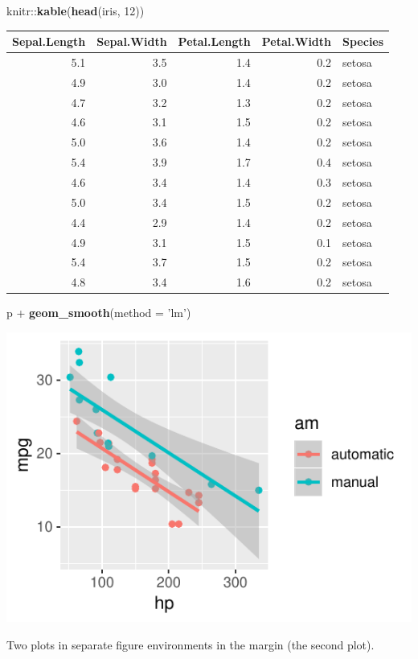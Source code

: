 \documentclass[]{tufte-handout}
\newenvironment{Shaded}{}{}
\newcommand{\DataTypeTok}[1]{\textcolor[rgb]{0.56,0.13,0.00}{#1}}
\newcommand{\DecValTok}[1]{\textcolor[rgb]{0.25,0.63,0.44}{#1}}
\newcommand{\KeywordTok}[1]{\textcolor[rgb]{0.00,0.44,0.13}{\textbf{#1}}}
\newcommand{\NormalTok}[1]{#1}
\newcommand{\OperatorTok}[1]{\textcolor[rgb]{0.40,0.40,0.40}{#1}}
\newcommand{\StringTok}[1]{\textcolor[rgb]{0.25,0.44,0.63}{#1}}
\begin{document}
\begin{Shaded}
\begin{Highlighting}[]
\NormalTok{knitr}\OperatorTok{::}\KeywordTok{kable}\NormalTok{(}\KeywordTok{head}\NormalTok{(iris, }\DecValTok{12}\NormalTok{))}
\end{Highlighting}
\end{Shaded}

\begin{longtable}[]{@{}rrrrl@{}}
\toprule
Sepal.Length & Sepal.Width & Petal.Length & Petal.Width &
Species\tabularnewline
\midrule
\endhead
5.1 & 3.5 & 1.4 & 0.2 & setosa\tabularnewline
4.9 & 3.0 & 1.4 & 0.2 & setosa\tabularnewline
4.7 & 3.2 & 1.3 & 0.2 & setosa\tabularnewline
4.6 & 3.1 & 1.5 & 0.2 & setosa\tabularnewline
5.0 & 3.6 & 1.4 & 0.2 & setosa\tabularnewline
5.4 & 3.9 & 1.7 & 0.4 & setosa\tabularnewline
4.6 & 3.4 & 1.4 & 0.3 & setosa\tabularnewline
5.0 & 3.4 & 1.5 & 0.2 & setosa\tabularnewline
4.4 & 2.9 & 1.4 & 0.2 & setosa\tabularnewline
4.9 & 3.1 & 1.5 & 0.1 & setosa\tabularnewline
5.4 & 3.7 & 1.5 & 0.2 & setosa\tabularnewline
4.8 & 3.4 & 1.6 & 0.2 & setosa\tabularnewline
\bottomrule
\end{longtable}

\begin{Shaded}
\begin{Highlighting}[]
\NormalTok{p }\OperatorTok{+}\StringTok{ }\KeywordTok{geom_smooth}\NormalTok{(}\DataTypeTok{method =} \StringTok{'lm'}\NormalTok{)}
\end{Highlighting}
\end{Shaded}

\begin{marginfigure}
\includegraphics{Epi_Notes_files/figure-latex/fig-margin-separate-2} \caption[Two plots in separate figure environments in the margin (the second plot)]{Two plots in separate figure environments in the margin (the second plot).}\label{fig:fig-margin-separate2}
\end{marginfigure}
\end{document}
